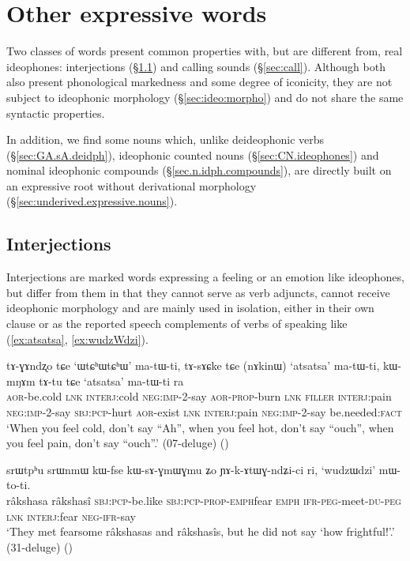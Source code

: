 \section{Other expressive words} \label{sec:other.expressive}
Two classes of words present common properties with, but are different from, real ideophones: interjections (§\ref{sec:interjections}) and calling sounds (§\ref{sec:call}). Although both also present phonological markedness and some degree of iconicity, they are not subject to ideophonic morphology (§\ref{sec:ideo:morpho}) and do not share the same syntactic properties. 

In addition, we find some nouns which, unlike deideophonic verbs (§\ref{sec:GA.sA.deidph}), ideophonic counted nouns (§\ref{sec:CN.ideophones}) and nominal ideophonic compounds (§\ref{sec.n.idph.compounds}), are directly built on an expressive root without derivational morphology (§\ref{sec:underived.expressive.nouns}).

 
\subsection{Interjections} \label{sec:interjections}
 Interjections are marked words expressing a feeling or an emotion like ideophones, but differ from them in that they cannot serve as verb adjuncts, cannot receive ideophonic morphology and are mainly used in isolation, either in their own clause or as the reported speech complements of verbs of speaking like  (\ref{ex:atsatsa}, \ref{ex:wudzWdzi}). 
 
\begin{exe}
\ex \label{ex:atsatsa}
\gll tɤ-ɣɤndʐo tɕe `ɯtɕʰɯtɕʰɯ' ma-tɯ-ti, tɤ-sɤɕke tɕe (nɤkinɯ) `atsatsa' ma-tɯ-ti, kɯ-mŋɤm tɤ-tu tɕe `atsatsa' ma-tɯ-ti ra  \\
 	\textsc{aor}-be.cold \textsc{lnk} \textsc{interj}:cold \textsc{neg}:\textsc{imp}-2-say \textsc{aor}-\textsc{prop}-burn \textsc{lnk} \textsc{filler} \textsc{interj}:pain \textsc{neg}:\textsc{imp}-2-say \textsc{sbj}:\textsc{pcp}-hurt \textsc{aor}-exist \textsc{lnk} \textsc{interj}:pain \textsc{neg}:\textsc{imp}-2-say be.needed:\textsc{fact} 	\\
\glt `When you feel cold, don't say ``Ah'', when you feel hot, don't say ``ouch'', when you  feel pain, don't say ``ouch''.' (07-deluge) ()
\end{exe}

\begin{exe}
\ex \label{ex:wudzWdzi}
\gll srɯtpʰu srɯnmɯ kɯ-fse kɯ-sɤ-ɣmɯ\redp{}ɣmu ʑo ɲɤ-k-ɤtɯɣ-ndʑi-ci ri,  `wudzɯdzi' mɯ-to-ti. \\
râkshasa râkshasî \textsc{sbj}:\textsc{pcp}-be.like \textsc{sbj}:\textsc{pcp}-\textsc{prop}-\textsc{emph}\redp{}fear \textsc{emph} \textsc{ifr}-\textsc{peg}-meet-\textsc{du}-\textsc{peg} \textsc{lnk} \textsc{interj}:fear \textsc{neg}-\textsc{ifr}-say \\
\glt `They met fearsome râkshasas and râkshasîs, but he did not say `how frightful!'.' (31-deluge) 	()
\end{exe}
 


